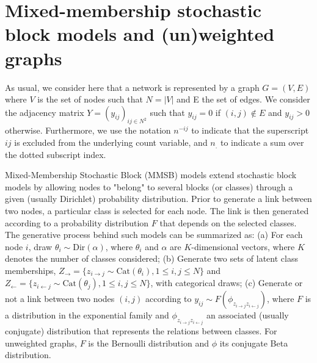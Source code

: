 \section{Mixed-membership stochastic block models and (un)weighted graphs}

As usual, we consider here that a network is represented by a graph $G=(V,E)$ where $V$ is the set of nodes such that $N=|V|$ and E the set of edges. We consider the adjacency matrix $Y=(y_{ij})_{ij\in N^2}$ such that $y_{ij}=0$ if $(i,j) \notin E$ and $y_{ij} > 0$ otherwise. Furthermore, we use the notation $n^{-ij}$ to indicate that the superscript $ij$ is excluded from the underlying count variable, and $n_{\bm{.}}$ to indicate a sum over the dotted subscript index.

Mixed-Membership Stochastic Block (MMSB) models extend stochastic block models \cite{airoldi2009mixed} by allowing nodes to "belong" to several blocks (or classes) through a given (usually Dirichlet) probability distribution. Prior to generate a link between two nodes, a particular class is selected for each node. The link is then generated according to a probability distribution $F$ that depends on the selected classes. The generative process behind such models can be summarized as: (a) For each node $i$, draw $\theta_i \sim \textrm{Dir}(\alpha)$, where $\theta_i$ and $\alpha$ are $K$-dimensional vectors, where $K$ denotes  the number of classes considered; (b) Generate two sets of latent class memberships, $Z_\rightarrow = \{z_{i\rightarrow j} \sim \textrm{Cat}(\theta_i),  1 \le i,j \le N\}$ and $Z_\leftarrow = \{z_{i\leftarrow j} \sim \textrm{Cat}(\theta_j),  1 \le i,j \le N\}$, with categorical draws; (c) Generate or not a link between two nodes $(i,j)$ according to $y_{ij} \sim F(\phi_{z_{i \rightarrow j}z_{i \leftarrow j}})$, where $F$ is a distribution in the exponential family and $\phi_{z_{i \rightarrow j}z_{i \leftarrow j}}$ an associated (usually conjugate) distribution that represents the relations between classes. For unweighted graphs, $F$ is the Bernoulli distribution and $\phi$ its conjugate Beta distribution.

